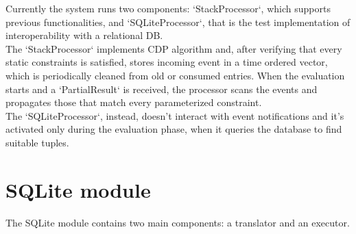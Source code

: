 Currently the system runs two components: `StackProcessor`, which supports previous functionalities, and `SQLiteProcessor`, that is the test implementation of interoperability with a relational DB.\\
The `StackProcessor` implements CDP algorithm and, after verifying that every static constraints is satisfied, stores incoming event in a time ordered vector, which is periodically cleaned from old or consumed entries. When the evaluation starts and a `PartialResult` is received, the processor scans the events and propagates those that match every parameterized constraint.\\
The `SQLiteProcessor`, instead, doesn't interact with event notifications and it's activated only during the evaluation phase, when it queries the database to find suitable tuples.

\section{SQLite module}
The SQLite module contains two main components: a translator and an executor.


